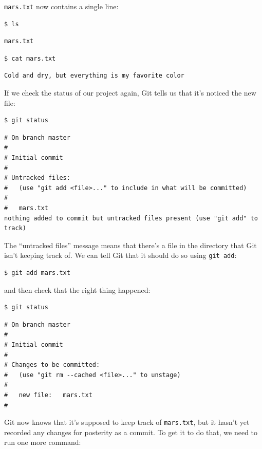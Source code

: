 \documentclass{book}
\begin{document}
\texttt{mars.txt} now contains a single line:

\begin{verbatim}
$ ls
\end{verbatim}

\begin{verbatim}
mars.txt
\end{verbatim}

\begin{verbatim}
$ cat mars.txt
\end{verbatim}

\begin{verbatim}
Cold and dry, but everything is my favorite color
\end{verbatim}

If we check the status of our project again, Git tells us that it's
noticed the new file:

\begin{verbatim}
$ git status
\end{verbatim}

\begin{verbatim}
# On branch master
#
# Initial commit
#
# Untracked files:
#   (use "git add <file>..." to include in what will be committed)
#
#   mars.txt
nothing added to commit but untracked files present (use "git add" to track)
\end{verbatim}

The ``untracked files'' message means that there's a file in the
directory that Git isn't keeping track of. We can tell Git that it
should do so using \texttt{git add}:

\begin{verbatim}
$ git add mars.txt
\end{verbatim}

and then check that the right thing happened:

\begin{verbatim}
$ git status
\end{verbatim}

\begin{verbatim}
# On branch master
#
# Initial commit
#
# Changes to be committed:
#   (use "git rm --cached <file>..." to unstage)
#
#   new file:   mars.txt
#
\end{verbatim}

Git now knows that it's supposed to keep track of \texttt{mars.txt}, but
it hasn't yet recorded any changes for posterity as a commit. To get it
to do that, we need to run one more command:
\end{document}

